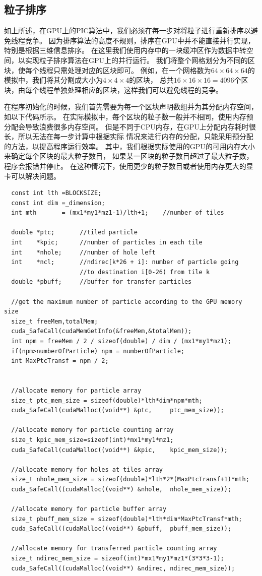 \subsection{粒子排序}
\label{section:PIC_GPU_reorder}
如上所述，在GPU上的PIC算法中，我们必须在每一步对将粒子进行重新排序以避免线程竞争。
因为排序算法的高度不规则，排序在GPU中并不能直接并行实现，特别是根据三维信息排序。
在这里我们使用内存中的一块缓冲区作为数据中转空间，以实现粒子排序算法在GPU上的并行运行。
我们将整个网格划分为不同的区块，使每个线程只需处理对应的区块即可。
例如，在一个网格数为$64 \times 64 \times 64$的模拟中，我们将其分割成大小为$4 \times 4 \times 4$的区块，
总共$16 \times 16 \times 16 = 4096$个区块，由每个线程单独处理相应的区块，这样我们可以避免线程的竞争。

在程序初始化的时候，我们首先需要为每一个区块声明数组并为其分配内存空间，如以下代码所示。
在实际模拟中，每个区块的粒子数一般并不相同，使用内存预分配会导致浪费很多内存空间。
但是不同于CPU内存，在GPU上分配内存耗时很长，所以无法在每一步计算中根据实际
情况来进行内存的分配，只能采用预分配的方法，以提高程序运行效率。
其中，我们根据实际使用的GPU的可用内存大小来确定每个区块的最大粒子数目，
如果某一区块的粒子数目超过了最大粒子数，程序会报错并停止。
在这种情况下，使用更少的粒子数目或者使用内存更大的显卡可以解决问题。

\begin{lstlisting}
  const int lth =BLOCKSIZE;
  const int dim =_dimension;
  int mth       = (mx1*my1*mz1-1)/lth+1;    //number of tiles

  double *ptc;       //tiled particle
  int    *kpic;      //number of particles in each tile
  int    *nhole;     //number of hole left
  int    *ncl;       //ndirec[k*26 + i]: number of particle going
                     //to destination i[0-26) from tile k
  double *pbuff;     //buffer for transfer particles

  //get the maximum number of particle according to the GPU memory size
  size_t freeMem,totalMem;
  cuda_SafeCall(cudaMemGetInfo(&freeMem,&totalMem));
  int npm = freeMem / 2 / sizeof(double) / dim / (mx1*my1*mz1);
  if(npm>numberOfParticle) npm = numberOfParticle;
  int MaxPtcTransf = npm / 2;


  //allocate memory for particle array
  size_t ptc_mem_size = sizeof(double)*lth*dim*npm*mth;
  cuda_SafeCall(cudaMalloc((void**) &ptc,     ptc_mem_size));

  //allocate memory for particle counting array
  size_t kpic_mem_size=sizeof(int)*mx1*my1*mz1;
  cuda_SafeCall(cudaMalloc((void**) &kpic,    kpic_mem_size));

  //allocate memory for holes at tiles array
  size_t nhole_mem_size = sizeof(double)*lth*2*(MaxPtcTransf+1)*mth;
  cuda_SafeCall((cudaMalloc((void**) &nhole,  nhole_mem_size));

  //allocate memory for particle buffer array
  size_t pbuff_mem_size = sizeof(double)*lth*dim*MaxPtcTransf*mth;
  cuda_SafeCall((cudaMalloc((void**) &pbuff,  pbuff_mem_size));

  //allocate memory for transferred particle counting array
  size_t ndirec_mem_size = sizeof(int)*mx1*my1*mz1*(3*3*3-1);
  cuda_SafeCall((cudaMalloc((void**) &ndirec, ndirec_mem_size));
\end{lstlisting}


